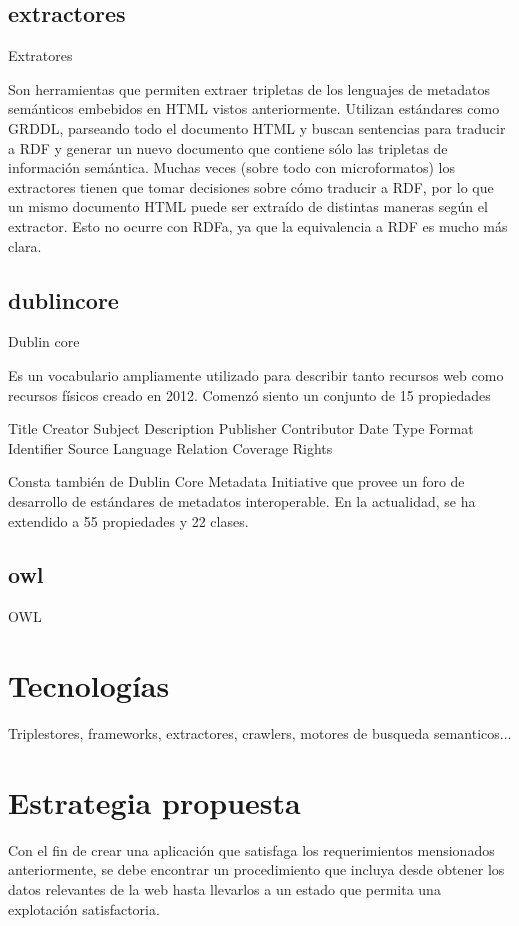 \subsection{extractores}

Extratores

Son herramientas que permiten extraer tripletas de los lenguajes de metadatos semánticos embebidos en HTML vistos anteriormente. 
Utilizan estándares como GRDDL, parseando todo el documento HTML y buscan sentencias para traducir a RDF y generar un nuevo documento 
que contiene sólo las tripletas de información semántica. 
Muchas veces (sobre todo con microformatos) los extractores tienen que tomar decisiones sobre cómo traducir a RDF, por lo que 
un mismo documento HTML puede ser extraído de distintas maneras según el extractor. Esto no ocurre con RDFa, ya que la equivalencia a RDF es mucho 
más clara.

\subsection{dublincore}

Dublin core

Es un vocabulario ampliamente utilizado para describir tanto recursos web como recursos físicos creado en 2012. Comenzó siento un conjunto de 15 
propiedades 

    Title
    Creator
    Subject
    Description
    Publisher
    Contributor
    Date
    Type
    Format
    Identifier
    Source
    Language
    Relation
    Coverage
    Rights

Consta también de Dublin Core Metadata Initiative que provee un foro de desarrollo de estándares de metadatos interoperable.
En la actualidad, se ha extendido a 55 propiedades y 22 clases.

\subsection{owl}

OWL



\section{Tecnologías}
Triplestores, frameworks, extractores, crawlers, motores de busqueda semanticos...

\section{Estrategia propuesta}
Con el fin de crear una aplicación que satisfaga los requerimientos mensionados anteriormente, se debe encontrar
un procedimiento que incluya desde obtener los datos relevantes de la web hasta llevarlos a un estado que permita una 
explotación satisfactoria. 

